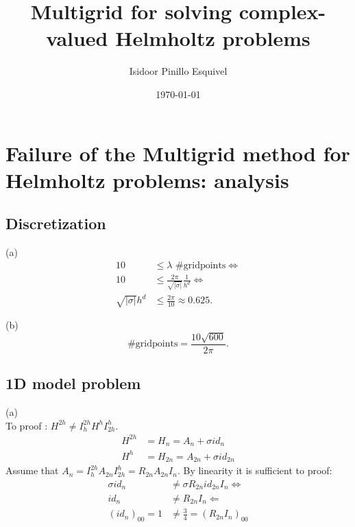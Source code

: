 \documentclass[a4paper,12pt]{article}
\begin{document}
\title{Multigrid for solving complex-valued Helmholtz problems}
\author{Isidoor Pinillo Esquivel}
\date{\today}
\maketitle

\section{Failure of the Multigrid method for Helmholtz problems: analysis}

\subsection{Discretization}
(a)
\begin{align}
    10                    & \leq \lambda \text{ \#gridpoints} \Leftrightarrow                \\
    10                    & \leq \frac{2\pi}{\sqrt{|\sigma|}} \frac{1}{h^{d}}\Leftrightarrow \\
    \sqrt{|\sigma|} h^{d} & \leq \frac{2 \pi}{10} \approx 0.625.
\end{align}

(b)
\[
    \text{\# gridpoints} = \frac{10 \sqrt{600}}{2 \pi}
    .\]

\subsection{1D model problem}
(a) \\
To proof : $H^{2 h} \neq I_h^{2 h} H^h I_{2 h}^h$.
\begin{align}
    H^{2h} & = H_n = A_n +\sigma {id}_n          \\
    H^{h}  & = H_{2n} = A_{2n} +\sigma {id}_{2n}
\end{align}
Assume that $A_n =I_h^{2 h} A_{2n} I_{2 h}^h= R_{2n} A_{2n} I_n$. By linearity it is  sufficient
to proof:
\begin{align}
    \sigma {id}_n  & \neq \sigma R_{2n} {id}_{2n} I_{n} \Leftrightarrow \\
    {id}_n         & \neq R_{2n} I_{n} \Leftarrow                       \\
    (id_n)_{00} =1 & \neq \frac{3}{4} = (R_{2n} I_{n})_{00}
\end{align}
\end{document}
